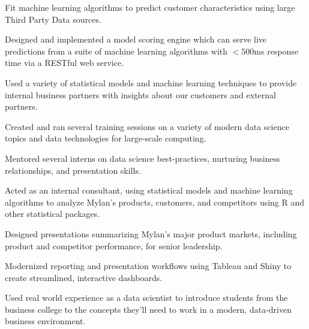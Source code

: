 \documentclass[letterpaper]{deedy-resume} %
\begin{document}
\begin{minipage}[t]{0.65\textwidth}
\hfill
{}
\begin{tightitemize}
\item Fit machine learning algorithms to predict customer characteristics using
  large Third Party Data sources.
\item Designed and implemented a model scoring engine which 
  can serve live predictions from a suite of machine learning algorithms with
  $<500$ms response time via a RESTful web service.
\item Used a variety of statistical models and machine learning techniques to
  provide internal business partners with insights about our customers and
  external partners.
\item Created and ran several training sessions on a variety of modern data
  science topics and data technologies for large-scale computing.
\item Mentored several interns on data science best-practices, nurturing
  business relationships, and presentation skills.
\end{tightitemize}
\sectionspace

\vspace{1.5em}

\hfill{}
\hfill{}
\begin{tightitemize}
\item Acted as an internal consultant, using statistical models and machine
  learning algorithms to 
  analyze Mylan's products, customers, and competitors using R and
  other statistical packages.
\item Designed presentations summarizing Mylan's major product markets,
  including product and competitor performance, for senior leadership.
\item Modernized reporting and presentation workflows using Tableau and
  Shiny to create streamlined, interactive dashboards.
\end{tightitemize}
\sectionspace %

\vspace{1.5em}
\hfill{}
\hfill
{}
\begin{tightitemize}
\item Used real world experience as a data scientist to introduce
  students from the business college to the concepts they'll need to
  work in a modern, data-driven  business environment.
\end{tightitemize}
\sectionspace %



\end{minipage} %
\end{document}
